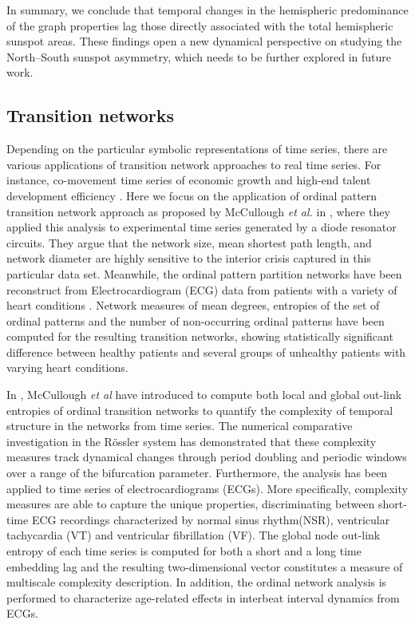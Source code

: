 		In summary, we conclude that temporal changes in the hemispheric predominance of the graph properties lag those directly associated with the total hemispheric sunspot areas. These findings open a new dynamical perspective on studying the North--South sunspot asymmetry, which needs to be further explored in future work. 


	\subsection{Transition networks}
	Depending on the particular symbolic representations of time series, there are various applications of transition network approaches to real time series. For instance, co-movement time series of economic growth and high-end talent development efficiency \cite{Zhang2018b}. Here we focus on the application of ordinal pattern transition network approach as proposed by McCullough {\textit{et al.}} in \cite{McCullough2015}, where they applied this analysis to experimental time series generated by a diode resonator circuits. They argue that the network size, mean shortest path length, and network diameter are highly sensitive to the interior crisis captured in this particular data set. Meanwhile, the ordinal pattern partition networks have been reconstruct from Electrocardiogram (ECG) data from patients with a variety of heart conditions \cite{Kulp2016b}. Network measures of mean degrees, entropies of the set of ordinal patterns and the number of non-occurring ordinal patterns have been computed for the resulting transition networks, showing statistically significant difference between healthy patients and several groups of unhealthy patients with varying heart conditions. 
	
	In \cite{McCullough2017b}, McCullough {\textit{et al}} have introduced to compute both local and global out-link entropies of ordinal transition networks to quantify the complexity of temporal structure in the networks from time series. The numerical comparative investigation in the R\"ossler system has demonstrated that these complexity measures track dynamical changes through period doubling and periodic windows over a range of the bifurcation parameter. Furthermore, the analysis has been applied to time series of electrocardiograms (ECGs). More specifically, complexity measures are able to capture the unique properties, discriminating between short-time ECG recordings characterized by normal sinus rhythm(NSR), ventricular tachycardia (VT) and ventricular fibrillation (VF). The global node out-link entropy of each time series is computed for both a short and a long time embedding lag and the resulting two-dimensional vector constitutes a measure of multiscale complexity description. In addition, the ordinal network analysis is performed to characterize age-related effects in interbeat interval dynamics from ECGs. 
		
